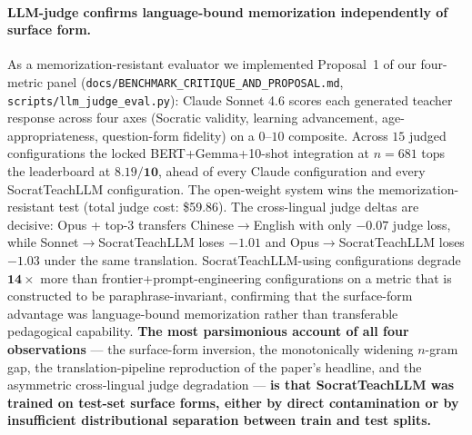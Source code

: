 \documentclass[11pt]{article}
\begin{document}
\paragraph{LLM-judge confirms language-bound memorization independently of surface form.} As a memorization-resistant evaluator we implemented Proposal~1 of our four-metric panel (\texttt{docs/BENCHMARK\_CRITIQUE\_AND\_PROPOSAL.md}, \texttt{scripts/llm\_judge\_eval.py}): Claude Sonnet 4.6 scores each generated teacher response across four axes (Socratic validity, learning advancement, age-appropriateness, question-form fidelity) on a $0$--$10$ composite. Across $15$ judged configurations the locked BERT+Gemma+10-shot integration at $n{=}681$ tops the leaderboard at $\mathbf{8.19/10}$, ahead of every Claude configuration and every SocratTeachLLM configuration. The open-weight system wins the memorization-resistant test (total judge cost: \$59.86). The cross-lingual judge deltas are decisive: Opus + top-3 transfers Chinese$\to$English with only $-0.07$ judge loss, while Sonnet$\to$SocratTeachLLM loses $-1.01$ and Opus$\to$SocratTeachLLM loses $-1.03$ under the same translation. SocratTeachLLM-using configurations degrade $\mathbf{14\times}$ more than frontier+prompt-engineering configurations on a metric that is constructed to be paraphrase-invariant, confirming that the surface-form advantage was language-bound memorization rather than transferable pedagogical capability. \textbf{The most parsimonious account of all four observations} --- the surface-form inversion, the monotonically widening $n$-gram gap, the translation-pipeline reproduction of the paper's headline, and the asymmetric cross-lingual judge degradation --- \textbf{is that SocratTeachLLM was trained on test-set surface forms, either by direct contamination or by insufficient distributional separation between train and test splits.}
\end{document}
